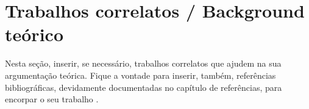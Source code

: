 \section{Trabalhos correlatos / Background teórico}

Nesta seção, inserir, se necessário, trabalhos correlatos que ajudem na sua argumentação teórica. Fique a vontade para inserir, também, referências bibliográficas, devidamente documentadas no capítulo de referências, para encorpar o seu trabalho \cite{teste}.